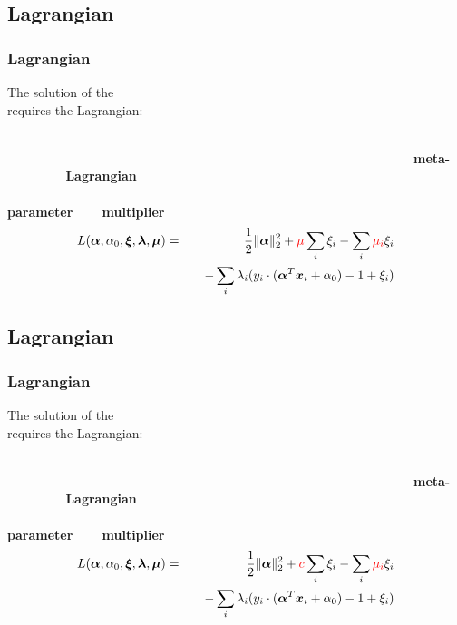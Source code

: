 \subsection{Lagrangian}

\begin{frame}
  \frametitle{Lagrangian}

  The solution of the  \\
  requires the Lagrangian:

~\\ 
~~~~~~~~~~~~~~~~~~~~~~~~~~~~~~~~~~~~~~~~~~~~~~~~~~~~~~~~~~~~~~~~\bf{meta-}~~~~~~~~\bf{Lagrangian}\\
~~~~~~~~~~~~~~~~~~~~~~~~~~~~~~~~~~~~~~~~~~~~~~~~~~~~~~~~~~~~~~\bf{parameter}~~~~\bf{multiplier}
  \begin{eqnarray*}
    L(\vec \alpha, \alpha_0, \vec \xi, \vec \lambda, \vec \mu)
	  & = & \frac{1}{2} {\|\vec \alpha\|^2_2} + {\color{red} \mu} \sum_i \xi_i  -\sum_i {\color{red} \mu_i} \xi_i\\
     &   & \quad - \sum_i \lambda_i (y_i\cdot (\vec \alpha^T\vec x_i + \alpha_0) -1+\xi_i)
  \end{eqnarray*}
\end{frame}

\subsection{Lagrangian}

\begin{frame}
  \frametitle{Lagrangian}

  The solution of the  \\
  requires the Lagrangian:

~\\ 
~~~~~~~~~~~~~~~~~~~~~~~~~~~~~~~~~~~~~~~~~~~~~~~~~~~~~~~~~~~~~~~~\bf{meta-}~~~~~~~~\bf{Lagrangian}\\
~~~~~~~~~~~~~~~~~~~~~~~~~~~~~~~~~~~~~~~~~~~~~~~~~~~~~~~~~~~~~~\bf{parameter}~~~~\bf{multiplier}
  \begin{eqnarray*}
    L(\vec \alpha, \alpha_0, \vec \xi, \vec \lambda, \vec \mu)
	  & = & \frac{1}{2} {\|\vec \alpha\|^2_2} + {\color{red} c} \sum_i \xi_i  -\sum_i {\color{red} \mu_i} \xi_i\\
     &   & \quad - \sum_i \lambda_i (y_i\cdot (\vec \alpha^T\vec x_i + \alpha_0) -1+\xi_i)
  \end{eqnarray*}
\end{frame}


